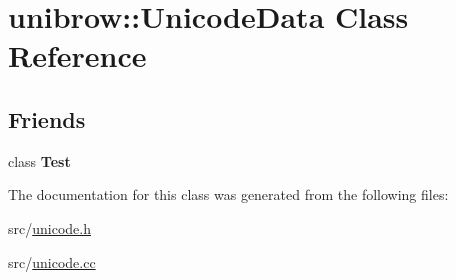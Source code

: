 \hypertarget{classunibrow_1_1_unicode_data}{}\section{unibrow\+:\+:Unicode\+Data Class Reference}
\label{classunibrow_1_1_unicode_data}
\subsection*{Friends}
\begin{DoxyCompactItemize}
\item 
\hypertarget{classunibrow_1_1_unicode_data_a5b78b1c2e1fa07ffed92da365593eaa4}{}class {\bfseries Test}\label{classunibrow_1_1_unicode_data_a5b78b1c2e1fa07ffed92da365593eaa4}

\end{DoxyCompactItemize}


The documentation for this class was generated from the following files\+:\begin{DoxyCompactItemize}
\item 
src/\hyperlink{unicode_8h}{unicode.\+h}\item 
src/\hyperlink{unicode_8cc}{unicode.\+cc}\end{DoxyCompactItemize}
